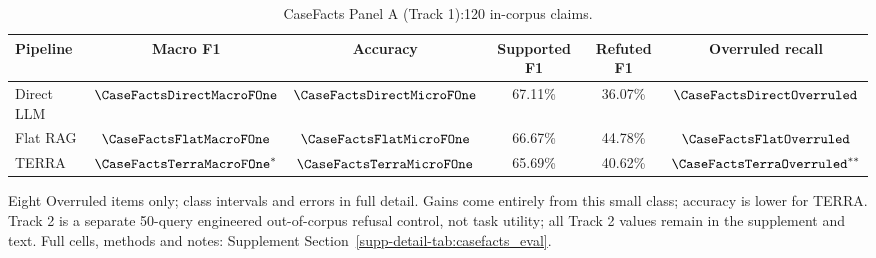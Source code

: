 \begin{table}[!t]
\caption{CaseFacts Panel A (Track 1):120 in-corpus claims.}
\label{tab:casefacts_eval}
\centering\begingroup\fontsize{8}{9.6}\selectfont\setlength{\tabcolsep}{3pt}\renewcommand{\arraystretch}{1.15}
\begin{tabular}{lccccc}
\toprule
Pipeline & Macro F1 & Accuracy & Supported F1 & Refuted F1 & Overruled recall \\
\midrule
Direct LLM & $\CaseFactsDirectMacroFOne$ & $\CaseFactsDirectMicroFOne$ & 67.11\% & 36.07\% & $\CaseFactsDirectOverruled$ \\
Flat RAG & $\CaseFactsFlatMacroFOne$ & $\CaseFactsFlatMicroFOne$ & 66.67\% & 44.78\% & $\CaseFactsFlatOverruled$ \\
TERRA & $\CaseFactsTerraMacroFOne^*$ & $\CaseFactsTerraMicroFOne$ & 65.69\% & 40.62\% & $\CaseFactsTerraOverruled^{**}$ \\
\bottomrule
\end{tabular}
\endgroup\par\vspace{2pt}
\raggedright\footnotesize Eight Overruled items only; class intervals and errors in full detail. Gains come entirely from this small class; accuracy is lower for TERRA. Track 2 is a separate 50-query engineered out-of-corpus refusal control, not task utility; all Track 2 values remain in the supplement and text. Full cells, methods and notes: Supplement Section~\ref{supp-detail-tab:casefacts_eval}.
\end{table}
